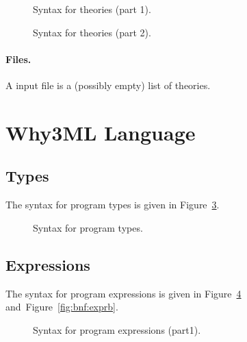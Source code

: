 \begin{figure}
  \begin{center}\framebox{}\end{center}
  \caption{Syntax for theories (part 1).}
\label{fig:bnf:theorya}
\end{figure}

\begin{figure}
  \begin{center}\framebox{}\end{center}
  \caption{Syntax for theories (part 2).}
\label{fig:bnf:theoryb}
\end{figure}

\paragraph{Files.}
A \why input file is a (possibly empty) list of theories.
\begin{center}\framebox{}\end{center}


\clearpage
\section{Why3ML Language}\label{sec:syntax:whyml}

\subsection{Types}

The syntax for program types is given in Figure~\ref{fig:bnf:typev}.
\begin{figure}
  \begin{center}\framebox{}\end{center}
  \caption{Syntax for program types.}
\label{fig:bnf:typev}
\end{figure}

\subsection{Expressions}

The syntax for program expressions is given in
Figure~\ref{fig:bnf:expra} and~Figure~\ref{fig:bnf:exprb}.
\begin{figure}
  \begin{center}\framebox{}\end{center}
  \caption{Syntax for program expressions (part1).}
\label{fig:bnf:expra}
\end{figure}

